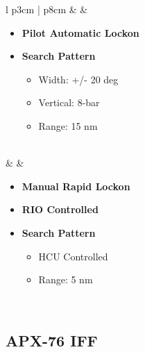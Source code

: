 \documentclass[8pt,usenames,dvipsnames,twoside]{article}
\begin{document}
\begin{center}
\begin{longtable}{l p{3cm} | p{8cm}}
			\midrule
			\textbullet &  &
			\begin{minipage}[t]{\linewidth}
				\vspace{-7pt}
				\begin{itemize}
					\item \textbf{Pilot Automatic Lockon}
					\item \textbf{Search Pattern}
					\begin{itemize}
						\item Width: +/- 20 deg
						\item Vertical: 8-bar
						\item Range: 15 nm
					\end{itemize}
				\end{itemize}
			\end{minipage} \\
			\midrule
			\textbullet &  &
			\begin{minipage}[t]{\linewidth}
				\vspace{-7pt}
				\begin{itemize}
					\item \textbf{Manual Rapid Lockon}
					\item \textbf{RIO Controlled}
					\item \textbf{Search Pattern}
					\begin{itemize}
						\item HCU Controlled
						\item Range: 5 nm
					\end{itemize}
				\end{itemize}
			\end{minipage} \\
			\bottomrule
		\end{longtable}
	\end{center}

	\subsection{APX-76 IFF}


	\cleardoublepage

	\hypertarget{subsec:tidsymb}{}
\end{document}
